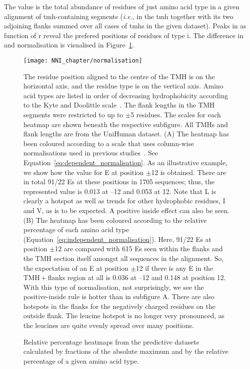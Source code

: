 The value  is the total abundance of residues of just amino acid type  in a given alignment of \gls{tmh}-containing segments (\textit{i.e.}, in the \gls{tmh} together with its two adjoining flanks summed over all cases of \gls{tmh}s in the given dataset). Peaks in as function of r reveal the prefered positions of residues of type i. The difference in   and   normalisation is visualised in Figure~\ref{fig:normalisation}.

\begin{figure}[!ht]
\centering
\texttt{[image: NNI\_chapter/normalisation]}
\caption{Relative percentage heatmaps from the predictive datasets calculated by fractions of the absolute maximum and by the relative percentage of a given amino acid type.}
\medskip
\justify
\small
 The residue position aligned to the centre of the TMH is on the horizontal axis, and the residue type is on the vertical axis. Amino acid types are listed in order of decreasing hydrophobicity according to the Kyte and Doolittle scale~\cite{Kyte1982}. The flank lengths in the TMH segments were restricted to up to $\pm$5 residues. The scales for each heatmap are shown beneath the respective subfigure. All TMHs and flank lengths are from the UniHuman dataset. (A) The heatmap has been coloured according to a scale that uses column-wise normalisations used in previous studies~\cite{Sharpe2010}. See Equation~\ref{eq:dependent_normalisation}. As an illustrative example, we show how the value for E at position $\pm$12 is obtained. There are in total 91/22 Es at these positions in 1705 sequences; thus, the represented value is 0.013 at –12 and 0.053 at 12. Note that L is clearly a hotspot as well as trends for other hydrophobic residues, I and V, as is to be expected. A positive inside effect can also be seen. (B) The heatmap has been coloured according to the relative percentage of each amino acid type (Equation~\ref{eq:independent_normalisation}). Here, 91/22 Es at position $\pm$12 are compared with 615 Es seen within the flanks and the TMH section itself amongst all sequences in the alignment. So, the expectation of an E at position $\pm$12 if there is any E in the TMH + flanks region at all is 0.036 at –12 and 0.148 at position 12. With this type of normalisation, not surprisingly, we see the positive-inside rule is hotter than in subfigure A. There are also hotspots in the flanks for the negatively charged residues on the outside flank. The leucine hotspot is no longer very pronounced, as the leucines are quite evenly spread over many positions.
\label{fig:normalisation}
\end{figure}

